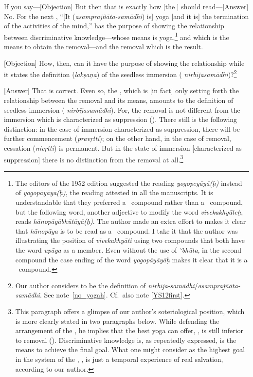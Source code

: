 If%
 you say---[Objection] But then that is exactly how [the \sutra] should read---[Answer] No.  For the next \sutra, ``[It (\emph{asamprajñāta-samādhi}) is] yoga [and it is] the termination of the activities of the mind,'' has the purpose of showing the relationship
between discriminative knowledge---whose means is yoga,\footnote{The editors of the 1952 edition suggested the reading \emph{yogopeyāyā(ḥ)} instead of \emph{yogopāyāyā(ḥ)}, the reading attested in all the manuscripts.  It is understandable that they preferred a \TP\ compound rather than a \BV\ compound, but the following word, another adjective to modify the word \emph{vivekakhyāteḥ}, reads \emph{hānopāyābhūtāyā(ḥ)}.  The author made an extra effort to makes it clear that \emph{hānopāya} is to be read as a \TP\ compound.  I take it that the author was illustrating the position of \emph{vivekakhyāti} using two compounds that both have the word \emph{upāya} as a member.  Even without the use of \emph{°bhūta}, in the second compound the case ending of the word \emph{yogopāyāyāḥ} makes it clear that it is a \BV\ compound.}
and which is the means to obtain the removal---and the removal which is
the result.

[Objection]%
 How, then, can it
have the purpose of showing the relationship while it states the
definition (\emph{lakṣaṇa}) of the seedless immersion (\emph{%
  nirbīja\-samādhi})?\footnote{Our author considers  to be the definition of \emph{nirbīja-samādhi}/\emph{asamprajñāta-sa\-mā\-dhi}.  See note~\ref{no_yogah}. Cf.\ also note \ref{YS12first}.}

[Answer]%
 That is correct.  Even so, the \sutra, which
is [in fact] only setting forth the relationship between the removal and its means,
amounts to the definition of seedless immersion (\emph{%
  nirbīja\-samādhi}).  For, the removal is not different from the
immersion which is characterized as suppression  (\nirodha).
There still is the following distinction: in the case of immersion
characterized as suppression, there will be further
commencement (\emph{pravṛtti}); on the other hand, in the case of removal, cessation (\emph{nivṛtti}) is permanent.  But in the state of immersion [characterized as suppression] there is no distinction from the removal at all.\footnote{This paragraph offers a glimpse of our author's soteriological position, which is more clearly stated in two paragraphs below. While defending the arrangement of the \PYS, he implies that the best yoga can offer, \nirbijasamadhi, is still inferior to removal (\hana).  Discriminative knowledge is, as repeatedly expressed, is the means to achieve the final goal.  What one might consider as the highest goal in the system of the \PYS, \nirbijasamadhi, is just a temporal experience of real salvation, according to our author.}

